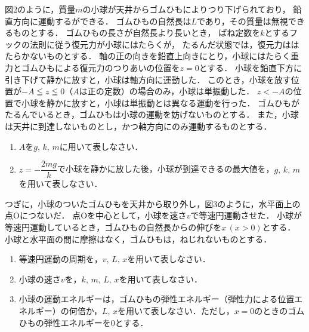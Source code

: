 図2のように，質量$m$の小球が天井からゴムひもによりつり下げられており，
鉛直方向に運動するができる．
ゴムひもの自然長は$L$であり，その質量は無視できるものとする．
ゴムひもの長さが自然長より長いとき，
ばね定数を$k$とするフックの法則に従う復元力が小球にはたらくが，
たるんだ状態では，復元力ははたらかないものとする．
\z 軸の正の向きを鉛直上向きにとり，小球にはたらく重力とゴムひもによる復元力のつりあいの位置を$z=0$とする．
小球を鉛直下方に引き下げて静かに放すと，小球は\z 軸方向に運動した．
このとき，小球を放す位置が$-A\leqq z\leqq 0$（$A$は正の定数）の場合のみ，小球は単振動した．
$z<-A$の位置で小球を静かに放すと，小球は単振動とは異なる運動を行った．
ゴムひもがたるんでいるとき，ゴムひもは小球の運動を妨げないものとする．
また，小球は天井に到達しないものとし，かつ\z 軸方向にのみ運動するものとする．

\begin{enumerate}[（1）]
  \setlength{\leftskip}{-1.5zw}
  \setlength{\itemindent}{1zw}\setlength{\labelsep}{0.5zw}
  \setlength{\labelwidth}{1zw}\setlength{\leftmargin}{1zw}
  \setlength{\itemsep}{0.5\baselineskip}
  \addtocounter{enumi}{4}
  \item $A$を$g,\,k,\,m$に用いて表しなさい．
  \item $z=-\dfrac{2mg}{k}$で小球を静かに放した後，小球が到達できる\z の最大値を，$g,\,k,\,m$を用いて表しなさい．
\end{enumerate}

つぎに，小球のついたゴムひもを天井から取り外し，図3のように，水平面上の点Oにつないだ．
点Oを中心として，小球を速さ$v$で等速円運動させた．
小球が等速円運動しているとき，ゴムひもの自然長からの伸びを$x\,(x>0)$とする．
小球と水平面の間に摩擦はなく，ゴムひもは，ねじれないものとする．

\begin{enumerate}[（1）]
  \setlength{\leftskip}{-1.5zw}
  \setlength{\itemindent}{1zw}\setlength{\labelsep}{0.5zw}
  \setlength{\labelwidth}{1zw}\setlength{\leftmargin}{1zw}
  \setlength{\itemsep}{0.5\baselineskip}
  \addtocounter{enumi}{6}
  \item 等速円運動の周期を，$v,\,L,\,x$を用いて表しなさい．
  \item 小球の速さ$v$を，$k,\,m,\,L,\,x$を用いて表しなさい．
  \item 小球の運動エネルギーは，ゴムひもの弾性エネルギー（弾性力による位置エネルギー）の何倍か，$L,\,x$を用いて表しなさい．ただし，$x=0$のときのゴムひもの弾性エネルギーを0とする．
\end{enumerate}


